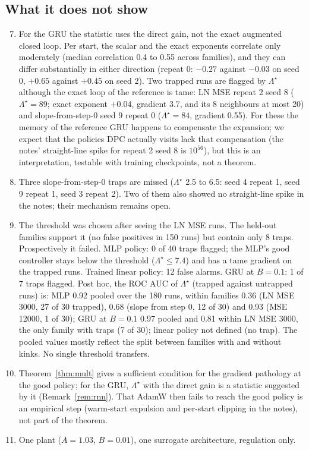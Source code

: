 \documentclass[11pt]{article}
\theoremstyle{plainnote}
\begin{document}
\subsection{What it does not show}
\begin{enumerate}
\setcounter{enumi}{6}
\item For the GRU the statistic uses the direct gain, not the exact augmented closed loop. Per start, the scalar and the exact exponents correlate only moderately (median correlation 0.4 to 0.55 across families), and they can differ substantially in either direction (repeat 0: $-0.27$ against $-0.03$ on seed 0, $+0.65$ against $+0.45$ on seed 2). Two trapped runs are flagged by $\Lambda^\star$ although the exact loop of the reference is tame: LN MSE repeat 2 seed 8 ($\Lambda^\star=89$; exact exponent $+0.04$, gradient 3.7, and its 8 neighbours at most 20) and slope-from-step-0 seed 9 repeat 0 ($\Lambda^\star=84$, gradient 0.55). For these the memory of the reference GRU happens to compensate the expansion; we expect that the policies DPC actually visits lack that compensation (the notes' straight-line spike for repeat 2 seed 8 is $10^{56}$), but this is an interpretation, testable with training checkpoints, not a theorem.
\item Three slope-from-step-0 traps are missed ($\Lambda^\star$ 2.5 to 6.5: seed 4 repeat 1, seed 9 repeat 1, seed 3 repeat 2). Two of them also showed no straight-line spike in the notes; their mechanism remains open.
\item The threshold was chosen after seeing the LN MSE runs. The held-out families support it (no false positives in 150 runs) but contain only 8 traps. Prospectively it failed. MLP policy: 0 of 40 traps flagged; the MLP's good controller stays below the threshold ($\Lambda^\star\le7.4$) and has a tame gradient on the trapped runs. Trained linear policy: 12 false alarms. GRU at $B=0.1$: 1 of 7 traps flagged. Post hoc, the ROC AUC of $\Lambda^\star$ (trapped against untrapped runs) is: MLP 0.92 pooled over the 180 runs, within families 0.36 (LN MSE 3000, 27 of 30 trapped), 0.68 (slope from step 0, 12 of 30) and 0.93 (MSE 12000, 1 of 30); GRU at $B=0.1$ 0.97 pooled and 0.81 within LN MSE 3000, the only family with traps (7 of 30); linear policy not defined (no trap). The pooled values mostly reflect the split between families with and without kinks. No single threshold transfers.
\item Theorem~\ref{thm:mult} gives a sufficient condition for the gradient pathology at the good policy; for the GRU, $\Lambda^\star$ with the direct gain is a statistic suggested by it (Remark~\ref{rem:rnn}). That AdamW then fails to reach the good policy is an empirical step (warm-start expulsion and per-start clipping in the notes), not part of the theorem.
\item One plant ($A=1.03$, $B=0.01$), one surrogate architecture, regulation only.
\end{enumerate}
\end{document}
